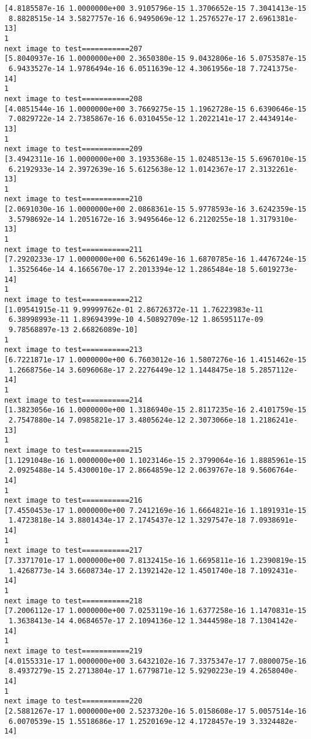 \documentclass[11pt]{article}
\begin{document}
\begin{Verbatim}[commandchars=\\\{\}]
[4.8185587e-16 1.0000000e+00 3.9105796e-15 1.3706652e-15 7.3041413e-15
 8.8828515e-14 3.5827757e-16 6.9495069e-12 1.2576527e-17 2.6961381e-13]
1
next image to test===========207
[5.8040937e-16 1.0000000e+00 2.3650380e-15 9.0432806e-16 5.0753587e-15
 6.9433527e-14 1.9786494e-16 6.0511639e-12 4.3061956e-18 7.7241375e-14]
1
next image to test===========208
[4.0851544e-16 1.0000000e+00 3.7669275e-15 1.1962728e-15 6.6390646e-15
 7.0829722e-14 2.7385867e-16 6.0310455e-12 1.2022141e-17 2.4434914e-13]
1
next image to test===========209
[3.4942311e-16 1.0000000e+00 3.1935368e-15 1.0248513e-15 5.6967010e-15
 6.2192933e-14 2.3972639e-16 5.6125638e-12 1.0142367e-17 2.3132261e-13]
1
next image to test===========210
[2.0691030e-16 1.0000000e+00 2.0868361e-15 5.9778593e-16 3.6242359e-15
 3.5798692e-14 1.2051672e-16 3.9495646e-12 6.2120255e-18 1.3179310e-13]
1
next image to test===========211
[7.2920233e-17 1.0000000e+00 6.5626149e-16 1.6870785e-16 1.4476724e-15
 1.3525646e-14 4.1665670e-17 2.2013394e-12 1.2865484e-18 5.6019273e-14]
1
next image to test===========212
[1.09541915e-11 9.99999762e-01 2.86726372e-11 1.76223983e-11
 6.38998993e-11 1.89694399e-10 4.50892709e-12 1.86595117e-09
 9.78568897e-13 2.66826089e-10]
1
next image to test===========213
[6.7221871e-17 1.0000000e+00 6.7603012e-16 1.5807276e-16 1.4151462e-15
 1.2668756e-14 3.6096068e-17 2.2276449e-12 1.1448475e-18 5.2857112e-14]
1
next image to test===========214
[1.3823056e-16 1.0000000e+00 1.3186940e-15 2.8117235e-16 2.4101759e-15
 2.7547880e-14 7.0985821e-17 3.4805624e-12 2.3073066e-18 1.2186241e-13]
1
next image to test===========215
[1.1291048e-16 1.0000000e+00 1.1023146e-15 2.3799064e-16 1.8885961e-15
 2.0925488e-14 5.4300010e-17 2.8664859e-12 2.0639767e-18 9.5606764e-14]
1
next image to test===========216
[7.4550453e-17 1.0000000e+00 7.2412169e-16 1.6664821e-16 1.1891931e-15
 1.4723818e-14 3.8801434e-17 2.1745437e-12 1.3297547e-18 7.0938691e-14]
1
next image to test===========217
[7.3371701e-17 1.0000000e+00 7.8132415e-16 1.6695811e-16 1.2390819e-15
 1.4268773e-14 3.6608734e-17 2.1392142e-12 1.4501740e-18 7.1092431e-14]
1
next image to test===========218
[7.2006112e-17 1.0000000e+00 7.0253119e-16 1.6377258e-16 1.1470831e-15
 1.3638413e-14 4.0684657e-17 2.1094136e-12 1.3444598e-18 7.1304142e-14]
1
next image to test===========219
[4.0155331e-17 1.0000000e+00 3.6432102e-16 7.3375347e-17 7.0800075e-16
 8.4937279e-15 2.2713804e-17 1.6779871e-12 5.9290223e-19 4.2658040e-14]
1
next image to test===========220
[2.5881267e-17 1.0000000e+00 2.5237320e-16 5.0158608e-17 5.0057514e-16
 6.0070539e-15 1.5518686e-17 1.2520169e-12 4.1728457e-19 3.3324482e-14]

\end{Verbatim}
\end{document}
